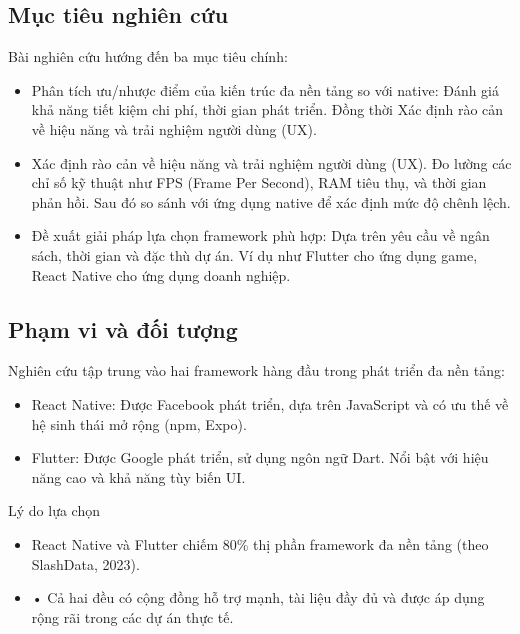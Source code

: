 % 
\subsection{Mục tiêu nghiên cứu}
\renewcommand{\labelitemi}{--}    
    \begin{flushleft}
        \hspace*{0.8cm}Bài nghiên cứu hướng đến ba mục tiêu chính:
        \setlength{\leftmargini}{1.5cm}
        \begin{itemize}
            \item Phân tích ưu/nhược điểm của kiến trúc đa nền tảng so với native: Đánh giá khả năng tiết kiệm chi phí, thời gian phát triển. Đồng thời Xác định rào cản về hiệu năng và trải nghiệm người dùng (UX).
            \item Xác định rào cản về hiệu năng và trải nghiệm người dùng (UX). Đo lường các chỉ số kỹ thuật như FPS (Frame Per Second), RAM tiêu thụ, và thời gian phản hồi. Sau đó so sánh với ứng dụng native để xác định mức độ chênh lệch.
            \item Đề xuất giải pháp lựa chọn framework phù hợp: Dựa trên yêu cầu về ngân sách, thời gian và đặc thù dự án. Ví dụ như Flutter cho ứng dụng game, React Native cho ứng dụng doanh nghiệp.
        \end{itemize}
    \end{flushleft}

\subsection{Phạm vi và đối tượng}
\renewcommand{\labelitemi}{--}    
    \begin{flushleft}
        \hspace*{0.8cm}Nghiên cứu tập trung vào hai framework hàng đầu trong phát triển đa nền tảng:
        \setlength{\leftmargini}{1.5cm}
        \begin{itemize}
            \item React Native: Được Facebook phát triển, dựa trên JavaScript và có ưu thế về hệ sinh thái mở rộng (npm, Expo).
            \item Flutter: Được Google phát triển, sử dụng ngôn ngữ Dart. Nổi bật với hiệu năng cao và khả năng tùy biến UI.
        \end{itemize}
    \end{flushleft}

    \begin{flushleft}
        \hspace*{0.8cm}Lý do lựa chọn
        \setlength{\leftmargini}{1.5cm}
        \begin{itemize}
            \item React Native và Flutter chiếm 80\% thị phần framework đa nền tảng (theo SlashData, 2023).
            \item •	Cả hai đều có cộng đồng hỗ trợ mạnh, tài liệu đầy đủ và được áp dụng rộng rãi trong các dự án thực tế.
        \end{itemize}
    \end{flushleft}

